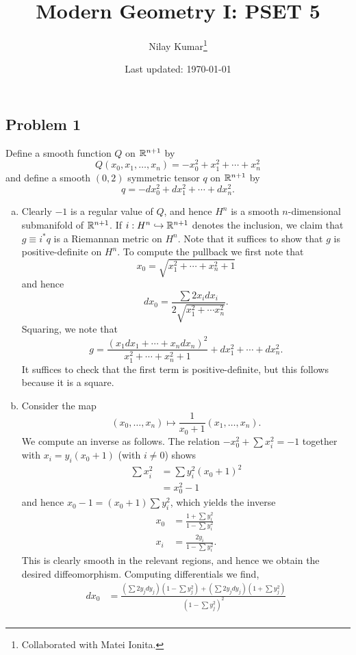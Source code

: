 \documentclass{../mathnotes}
\title{Modern Geometry I: PSET 5}
\author{Nilay Kumar\footnote{Collaborated with Matei Ionita.}}
\date{Last updated: \today}
\begin{document}
\maketitle

\subsection*{Problem 1}

Define a smooth function $Q$ on $\mathbb{R}^{n+1}$ by
\[Q(x_0,x_1,\ldots,x_n) = -x_0^2+x_1^2+\cdots+x_n^2\]
and define a smooth $(0,2)$ symmetric tensor $q$ on $\mathbb{R}^{n+1}$ by
\[q = -dx_0^2+dx_1^2+\cdots+dx_n^2.\]
\begin{enumerate}[(a)]
    \item Clearly $-1$ is a regular value of $Q$, and hence $H^n$ is a smooth $n$-dimensional
        submanifold of $\mathbb{R}^{n+1}$. If $i:H^n\hookrightarrow\mathbb{R}^{n+1}$ denotes the inclusion,
        we claim that $g\equiv i^*q$ is a Riemannan metric on $H^n$. Note that it suffices to
        show that $g$ is positive-definite on $H^n$. To compute the pullback we first note that
        \[x_0=\sqrt{x_1^2+\cdots+x_n^2+1}\]
        and hence
        \[dx_0=\frac{\sum 2x_idx_i}{2\sqrt{x_1^2+\cdots x_n^2}}.\]
        Squaring, we note that
        \[g = \frac{(x_1dx_1+\cdots+x_ndx_n)^2}{x_1^2+\cdots+x_n^2+1}+dx_1^2+\cdots+dx_n^2.\]
        It suffices to check that the first term is positive-definite, but this follows because it
        is a square.
    \item Consider the map
        \[(x_0,\ldots,x_n)\mapsto \frac{1}{x_0+1}(x_1,\ldots,x_n).\]
        We compute an inverse as follows. The relation $-x_0^2+\sum x_i^2=-1$ together with
        $x_i=y_i(x_0+1)$ (with $i\neq0$) shows
        \begin{align*}
            \sum x_i^2&=\sum y_i^2 (x_0+1)^2\\
            &= x_0^2-1
        \end{align*}
        and hence $x_0-1=(x_0+1)\sum y_i^2$, which yields the inverse
        \begin{align*}
            x_0 &= \frac{1+\sum y_i^2}{1-\sum y_i^2}\\
            x_i &= \frac{2 y_i}{1-\sum y_i^2}.
        \end{align*}
        This is clearly smooth in the relevant regions, and hence we obtain the desired
        diffeomorphism. Computing differentials we find,
        \begin{align*}
            dx_0 &= \frac{(\sum 2y_jdy_j)(1-\sum y_j^2)+(\sum 2y_jdy_j)(1+\sum y_j^2)}{(1-\sum y_j^2)^2}\\

\end{align*}
\end{enumerate}
\end{document}
